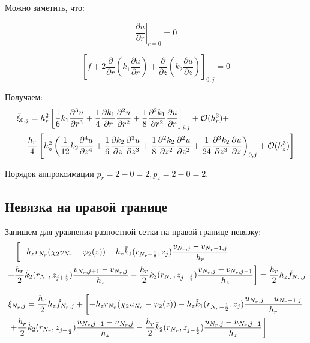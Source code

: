 Можно заметить, что:

\[
  \left. \frac{\partial u}{\partial r} \right|_{r=0} = 0
\]

\[
  \left[ f 
  + 2\frac{\partial }{ \partial r} \left( k_1 \frac{\partial u}{ \partial r} \right)
  + \frac{\partial }{ \partial z} \left( k_2 \frac{\partial u}{ \partial z} \right)
 \right]_{0, j} = 0
\]

Получаем:
\begin{align*}
  &\Tilde{\xi}_{0, j} = 
  h^2_r \left[
  \frac{1}{6}k_1 \frac{\partial^3 u}{ \partial r^3} +
  \frac{1}{4} \frac{\partial k_1}{ \partial r} \frac{\partial^2 u}{ \partial r^2} +
  \frac{1}{8} \frac{\partial^2 k_1}{ \partial r^2} \frac{\partial u}{ \partial r}
  \right]_{i ,j} + \mathcal{O}(h^3_r) + \\
 & + \frac{h_r}{4}\left[ h^2_z\left( 
  \frac{1}{12}k_2 \frac{\partial^4 u}{ \partial z^4}  +
  \frac{1}{6} \frac{\partial k_2}{ \partial z} \frac{\partial^3 u}{ \partial z^3} +
  \frac{1}{8} \frac{\partial^2 k_2}{ \partial z^2} \frac{\partial^2 u}{ \partial z^2} +
  \frac{1}{24} \frac{\partial^3 k_2}{ \partial z^3} \frac{\partial u}{ \partial z}
  \right)_{0, j}
  + \mathcal{O}(h^3_z) \right]
\end{align*}

Порядок аппроксимации $ p_r = 2 - 0 = 2, p_z = 2 - 0 = 2 $.

\subsection{Невязка на правой границе}

Запишем для уравнения разностной сетки на правой границе невязку:
\begin{align*}
  &- \left [ 
  -h_z r_{N_r} ( \chi_2 v_{N_r} - \varphi_2(z))
  - h_z \Tilde{k}_1(r_{N_r-\frac{1}{2}}, z_j) \frac{v_{N_r, j} - v_{N_r - 1, j}}{h_{r}}
  \right . \\
  &\left .
  + \frac{h_r}{2} \Tilde{k}_2(r_{N_r}, z_{j+\frac{1}{2}}) \frac{v_{N_r, j + 1} - v_{N_r, j}}{h_{z}}
  - \frac{h_r}{2} \Tilde{k}_2(r_{N_r}, z_{j-\frac{1}{2}}) \frac{v_{N_r, j} - v_{N_r, j - 1}}{h_z}
  \right ]  = \frac{h_r}{2} h_z \Tilde{f}_{N_r, j}
\end{align*}

\begin{align*}
  &\xi_{N_r, j} = \frac{h_r}{2} h_z \Tilde{f}_{N_r, j} + \left [ 
    -h_z r_{N_r} ( \chi_2 u_{N_r} - \varphi_2(z))
    - h_z \Tilde{k}_1(r_{N_r-\frac{1}{2}}, z_j) \frac{u_{N_r, j} - u_{N_r - 1, j}}{h_{r}}
    \right . \\
  &\left .
  + \frac{h_r}{2} \Tilde{k}_2(r_{N_r}, z_{j+\frac{1}{2}}) \frac{u_{N_r, j + 1} - u_{N_r, j}}{h_{z}}
    - \frac{h_r}{2} \Tilde{k}_2(r_{N_r}, z_{j-\frac{1}{2}}) \frac{u_{N_r, j} - u_{N_r, j - 1}}{h_z}
    \right ]
\end{align*}

